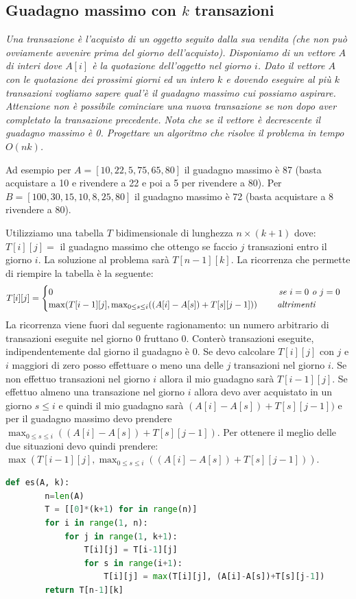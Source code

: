 \subsection{Guadagno massimo con $k$ transazioni}
\textit{Una transazione è l'acquisto di un oggetto seguito dalla sua vendita (che non può ovviamente avvenire prima del giorno dell'acquisto). Disponiamo di un vettore $A$ di interi dove $A[i]$ è la quotazione dell'oggetto nel giorno $i$. Dato il vettore $A$ con le quotazione dei prossimi giorni ed un intero $k$ e dovendo eseguire al più $k$ transazioni vogliamo sapere qual'è il guadagno massimo cui possiamo aspirare. Attenzione non è possibile cominciare una nuova transazione se non dopo aver completato la transazione precedente. Nota che se il vettore è decrescente il guadagno massimo è 0. Progettare un algoritmo che risolve il problema in tempo $O(nk)$.}

Ad esempio per $A = [10, 22, 5, 75, 65, 80]$ il guadagno massimo è 87 (basta acquistare a 10 e rivendere a 22 e poi a 5 per rivendere a 80). Per $B =[100, 30, 15, 10, 8, 25, 80]$ il guadagno massimo è 72 (basta acquistare a 8 rivendere a 80). 

Utilizziamo una tabella $T$ bidimensionale di lunghezza $n\times (k+1)$ dove: $T[i][j] =$ il guadagno massimo che ottengo se faccio $j$ transazioni entro il giorno $i$. La soluzione al problema sarà $T[n-1][k]$. La ricorrenza che permette di riempire la tabella è la seguente: 
\begin{equation*}T[i][j]=
\begin{cases}
    0\hspace{9cm}\textit{se }i=0\textit{ o }j=0\\
    \max(T[i-1][j], \max_{0\leq s\leq i}((A[i]-A[s])+ T[s][j-1]))\hspace{.8cm}\textit{altrimenti}
\end{cases}
\end{equation*}
La ricorrenza viene fuori dal seguente ragionamento: un numero arbitrario di transazioni eseguite nel giorno 0 fruttano 0. Conterò transazioni eseguite, indipendentemente dal giorno il guadagno è 0. Se devo calcolare $T[i][j]$ con $j$ e $i$ maggiori di zero posso effettuare o meno una delle $j$ transazioni nel giorno $i$. Se non effettuo transazioni nel giorno $i$ allora il mio guadagno sarà $T[i-1][j]$. Se effettuo almeno una transazione nel giorno $i$ allora devo aver acquistato in un giorno $s\leq i$ e quindi il mio guadagno sarà $(A[i]-A[s]) + T[s][j-1])$ e per il guadagno massimo devo prendere $\max_{0\leq s\leq i}((A[i]-A[s])+ T[s][j-1])$. Per ottenere il meglio delle due situazioni devo quindi prendere: $\max(T[i-1][j], \max_{0\leq s\leq i}((A[i]-A[s])+ T[s][j-1]))$.
\begin{lstlisting}[language=Python]
    def es(A, k):
        n=len(A)
        T = [[0]*(k+1) for in range(n)]
        for i in range(1, n):
            for j in range(1, k+1):
                T[i][j] = T[i-1][j]
                for s in range(i+1):
                    T[i][j] = max(T[i][j], (A[i]-A[s])+T[s][j-1])
        return T[n-1][k]
\end{lstlisting}

